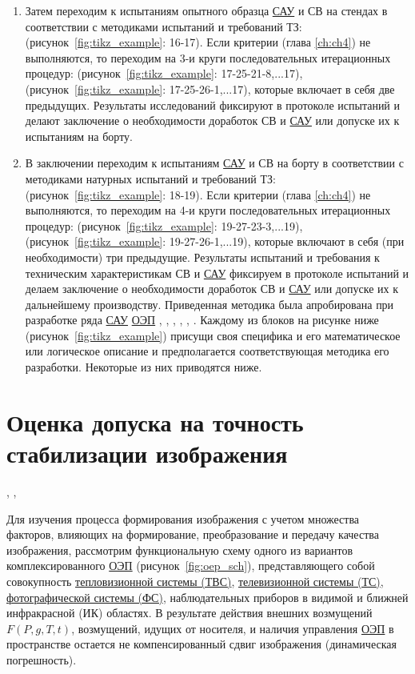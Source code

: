 \begin{enumerate}
	\item Затем переходим к испытаниям опытного образца \hyperref[acroSAU]{САУ} и СВ на стендах в соответствии с методиками испытаний и требований ТЗ: (рисунок~\ref{fig:tikz_example}: 16-17). Если критерии (глава \ref{ch:ch4}) не выполняются, то переходим  на 
	3-и круги последовательных итерационных процедур: (рисунок~\ref{fig:tikz_example}: 17-25-21-8,...17), (рисунок~\ref{fig:tikz_example}: 17-25-26-1,...17), которые включает в себя две предыдущих. Результаты исследований фиксируют в протоколе испытаний и делают заключение о необходимости доработок СВ и \hyperref[acroSAU]{САУ} или допуске их к испытаниям на борту. 
	
	\item В заключении переходим к испытаниям \hyperref[acroSAU]{САУ} и СВ на борту в соответствии с методиками натурных испытаний и требований ТЗ: (рисунок~\ref{fig:tikz_example}: 18-19). Если критерии (глава \ref{ch:ch4}) не выполняются, то переходим  на 
	4-и круги последовательных итерационных процедур: (рисунок~\ref{fig:tikz_example}: 19-27-23-3,...19), (рисунок~\ref{fig:tikz_example}: 19-27-26-1,...19), которые включают в себя (при необходимости) три предыдущие. Результаты испытаний и требования к техническим характеристикам СВ и \hyperref[acroSAU]{САУ} фиксируем в протоколе испытаний и делаем заключение о необходимости доработок СВ и \hyperref[acroSAU]{САУ} или допуске их к дальнейшему производству.
	Приведенная методика была апробирована при разработке ряда \hyperref[acroSAU]{САУ} \hyperref[acroEOS]{ОЭП} \cite[]{Belyakov}, \cite[]{Karpov}, \cite[]{Baloev16}, \cite[]{Karpov17}, \cite[]{Gerasin19}, \cite[]{Molin21}. Каждому из блоков на рисунке ниже (рисунок~\ref{fig:tikz_example}) присущи своя специфика и его математическое или логическое описание и предполагается соответствующая методика его разработки. Некоторые из них приводятся ниже.

\end{enumerate}

\section{Оценка допуска на точность стабилизации изображения} \cite[]{Belyakov}, \cite[]{Sokolski22}, \cite[]{Molin21} \label{sec:ch2/sec2} 



Для изучения процесса формирования изображения с учетом множества факторов, влияющих на формирование, преобразование и передачу качества изображения, рассмотрим функциональную схему одного из вариантов комплексированного \hyperref[acroEOS]{ОЭП} (рисунок~\ref{fig:oep_sch}), представляющего собой совокупность \hyperref[acroTVS]{тепловизионной системы (ТВС)}, \hyperref[acroTS]{телевизионной системы (ТС)}, \hyperref[acroFS]{фотографической системы (ФС)}, наблюдательных приборов в видимой и ближней инфракрасной (ИК) областях. В результате действия внешних возмущений $F(P,g,T,t)$, возмущений, идущих от носителя, и наличия управления \hyperref[acroEOS]{ОЭП} в пространстве остается не компенсированный сдвиг изображения (динамическая погрешность).


